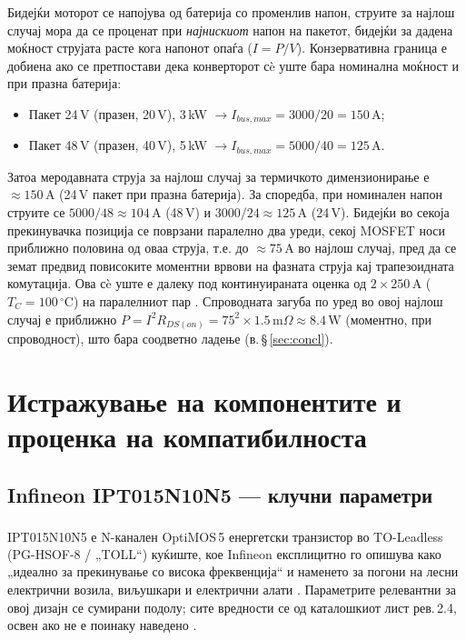 \documentclass[11pt,a4paper]{article}
\newcommand{\eng}[1]{\textenglish{#1}}
\begin{document}
\noindent
Бидејќи моторот се напојува од батерија со променлив напон, струите за најлош случај мора да се проценат при \emph{најнискиот} напон на пакетот, бидејќи за дадена моќност струјата расте кога напонот опаѓа ($I = P/V$). Конзервативна граница е добиена ако се претпостави дека конверторот сè уште бара номинална моќност и при празна батерија:
\begin{itemize}
  \item Пакет 24\,V (празен, 20\,V), 3\,kW $\rightarrow I_{bus,max} = 3000/20 = 150\,\mathrm{A}$;
  \item Пакет 48\,V (празен, 40\,V), 5\,kW $\rightarrow I_{bus,max} = 5000/40 = 125\,\mathrm{A}$.
\end{itemize}
Затоа меродавната струја за најлош случај за термичкото димензионирање е $\approx 150\,\mathrm{A}$ (24\,V пакет при празна батерија). За споредба, при номинален напон струите се $5000/48 \approx 104\,\mathrm{A}$ (48\,V) и $3000/24 \approx 125\,\mathrm{A}$ (24\,V). Бидејќи во секоја прекинувачка позиција се поврзани паралелно два уреди, секој MOSFET носи приближно половина од оваа струја, т.е. до $\approx 75\,\mathrm{A}$ во најлош случај, пред да се земат предвид повисоките моментни врвови на фазната струја кај трапезоидната комутација. Ова сè уште е далеку под континуираната оценка од $2\times 250\,\mathrm{A}$ ($T_C=100\,^\circ$C) на паралелниот пар \cite{ref1}. Спроводната загуба по уред во овој најлош случај е приближно $P = I^2 R_{DS(on)} = 75^2 \times 1.5\,\mathrm{m}\Omega \approx 8.4\,\mathrm{W}$ (моментно, при спроводност), што бара соодветно ладење (в.\,\S\,\ref{sec:concl}).

\section{Истражување на компонентите и проценка на компатибилноста}

\subsection{Infineon IPT015N10N5 --- клучни параметри}

IPT015N10N5 е N-канален OptiMOS\textsuperscript{\texttrademark}\,5 енергетски транзистор во \eng{TO-Leadless} (PG-HSOF-8 / „TOLL“) куќиште, кое Infineon експлицитно го опишува како „идеално за прекинување со висока фреквенција“ и наменето за погони на лесни електрични возила, виљушкари и електрични алати \cite{ref1,ref2}. Параметрите релевантни за овој дизајн се сумирани подолу; сите вредности се од каталошкиот лист рев.\,2.4, освен ако не е поинаку наведено \cite{ref1}.
\end{document}

